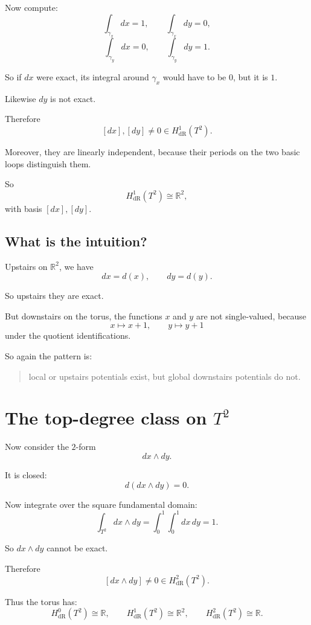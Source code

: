 \documentclass[11pt]{article}
\begin{document}
	Now compute:
	\[
	\int_{\gamma_x}dx=1,\qquad \int_{\gamma_x}dy=0,
	\]
	\[
	\int_{\gamma_y}dx=0,\qquad \int_{\gamma_y}dy=1.
	\]
	
	So if \(dx\) were exact, its integral around \(\gamma_x\) would have to be \(0\), but it is \(1\).
	
	Likewise \(dy\) is not exact.
	
	Therefore
	\[
	[dx],[dy]\neq 0\in H^1_{\mathrm{dR}}(T^2).
	\]
	
	Moreover, they are linearly independent, because their periods on the two basic loops distinguish them.
	
	So
	\[
	H^1_{\mathrm{dR}}(T^2)\cong \mathbb{R}^2,
	\]
	with basis \([dx],[dy]\).
	
	\subsection{What is the intuition?}
	
	Upstairs on \(\mathbb{R}^2\), we have
	\[
	dx=d(x),
	\qquad
	dy=d(y).
	\]
	
	So upstairs they are exact.
	
	But downstairs on the torus, the functions \(x\) and \(y\) are not single-valued, because
	\[
	x\mapsto x+1,\qquad y\mapsto y+1
	\]
	under the quotient identifications.
	
	So again the pattern is:
	
	\begin{quote}
		local or upstairs potentials exist, but global downstairs potentials do not.
	\end{quote}
	
	\section{The top-degree class on \(T^2\)}
	
	Now consider the \(2\)-form
	\[
	dx\wedge dy.
	\]
	
	It is closed:
	\[
	d(dx\wedge dy)=0.
	\]
	
	Now integrate over the square fundamental domain:
	\[
	\int_{T^2} dx\wedge dy
	=
	\int_0^1\int_0^1 dx\,dy
	=
	1.
	\]
	
	So \(dx\wedge dy\) cannot be exact.
	
	Therefore
	\[
	[dx\wedge dy]\neq 0\in H^2_{\mathrm{dR}}(T^2).
	\]
	
	Thus the torus has:
	\[
	H^0_{\mathrm{dR}}(T^2)\cong \mathbb{R},
	\qquad
	H^1_{\mathrm{dR}}(T^2)\cong \mathbb{R}^2,
	\qquad
	H^2_{\mathrm{dR}}(T^2)\cong \mathbb{R}.
	\]
	
\end{document}

